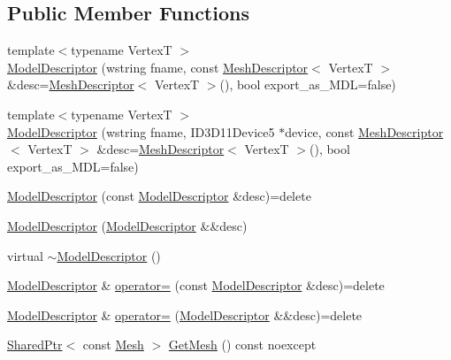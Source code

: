 \subsection*{Public Member Functions}
\begin{DoxyCompactItemize}
\item 
{\footnotesize template$<$typename VertexT $>$ }\\\hyperlink{classmage_1_1_model_descriptor_ab2668f353052165023161d146995ef26}{Model\+Descriptor} (wstring fname, const \hyperlink{structmage_1_1_mesh_descriptor}{Mesh\+Descriptor}$<$ VertexT $>$ \&desc=\hyperlink{structmage_1_1_mesh_descriptor}{Mesh\+Descriptor}$<$ VertexT $>$(), bool export\+\_\+as\+\_\+\+M\+DL=false)
\item 
{\footnotesize template$<$typename VertexT $>$ }\\\hyperlink{classmage_1_1_model_descriptor_a614126528dd48d7d27427f2d71092f20}{Model\+Descriptor} (wstring fname, I\+D3\+D11\+Device5 $\ast$device, const \hyperlink{structmage_1_1_mesh_descriptor}{Mesh\+Descriptor}$<$ VertexT $>$ \&desc=\hyperlink{structmage_1_1_mesh_descriptor}{Mesh\+Descriptor}$<$ VertexT $>$(), bool export\+\_\+as\+\_\+\+M\+DL=false)
\item 
\hyperlink{classmage_1_1_model_descriptor_af44185efc20e10ede762d29bc454c5f3}{Model\+Descriptor} (const \hyperlink{classmage_1_1_model_descriptor}{Model\+Descriptor} \&desc)=delete
\item 
\hyperlink{classmage_1_1_model_descriptor_af5ece586e2a8404cc29e703885531e72}{Model\+Descriptor} (\hyperlink{classmage_1_1_model_descriptor}{Model\+Descriptor} \&\&desc)
\item 
virtual \hyperlink{classmage_1_1_model_descriptor_aae13cf050ee7f9283d91282c04f62df1}{$\sim$\+Model\+Descriptor} ()
\item 
\hyperlink{classmage_1_1_model_descriptor}{Model\+Descriptor} \& \hyperlink{classmage_1_1_model_descriptor_a734b17224719896921e9f6252ee88483}{operator=} (const \hyperlink{classmage_1_1_model_descriptor}{Model\+Descriptor} \&desc)=delete
\item 
\hyperlink{classmage_1_1_model_descriptor}{Model\+Descriptor} \& \hyperlink{classmage_1_1_model_descriptor_ae2ae685569c0ae534d9f0b5622a807d0}{operator=} (\hyperlink{classmage_1_1_model_descriptor}{Model\+Descriptor} \&\&desc)=delete
\item 
\hyperlink{namespacemage_a1e01ae66713838a7a67d30e44c67703e}{Shared\+Ptr}$<$ const \hyperlink{classmage_1_1_mesh}{Mesh} $>$ \hyperlink{classmage_1_1_model_descriptor_a730dedd388929c74ed504395ad2601fc}{Get\+Mesh} () const noexcept

\end{DoxyCompactItemize}
